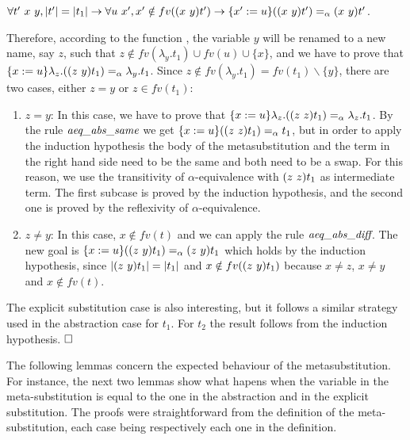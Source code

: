$\forall t'\ x\ y, |t'| = |t_1| \to \forall u\ x', x' \notin fv(\swap{x}{y}{t'}) \to \metasub{(\swap{x}{y}{t'})}{x'}{u} =_\alpha \swap{x}{y}{t'}$.
\begin{coqdoccode}
\end{coqdoccode}
Therefore, according to the function , the variable $y$ will be renamed to a new name, say $z$, such that $z \notin fv(\lambda_y.t_1) \cup fv(u) \cup \{x\}$, and we have to prove that $\metasub{\lambda_z.(\swap{z}{y}{t_1})}{x}{u} =_\alpha \lambda_y.t_1$. Since $z \notin fv(\lambda_y.t_1) = fv(t_1)\backslash \{y\}$, there are two cases, either $z = y$ or $z \in fv(t_1)$:
\begin{coqdoccode}
\end{coqdoccode}
\begin{enumerate}
   \item $z = y$: In this case, we have to prove that $\metasub{\lambda_z.(\swap{z}{z}{t_1})}{x}{u} =_\alpha \lambda_z.t_1$. By the rule $\mbox{\it aeq}\_\mbox{\it abs}\_\mbox{\it same}$ we get $\metasub{(\swap{z}{z}{t_1})}{x}{u} =_\alpha t_1$, but in order to apply the induction hypothesis the body of the metasubstitution and the term in the right hand side need to be the same and both need to be a swap. For this reason, we use the transitivity of $\alpha$-equivalence with $\swap{z}{z}{t_1}$ as intermediate term. The first subcase is proved by the induction hypothesis, and the second one is proved by the reflexivity of $\alpha$-equivalence.
\item $z \neq y$: In this case, $x \notin fv(t)$ and we can apply the rule $\mbox{\it aeq}\_\mbox{\it abs}\_\mbox{\it diff}$. The new goal is $\metasub{(\swap{z}{y}{t_1})}{x}{u} =_\alpha \swap{z}{y}{t_1}$ which holds by the induction hypothesis, since $|\swap{z}{y}{t_1}| = |t_1|$ and $x \notin fv(\swap{z}{y}{t_1})$ because $x \neq z$, $x \neq y$ and $x \notin fv(t)$.
  \end{enumerate}
\begin{coqdoccode}
\end{coqdoccode}
The explicit substitution case is also interesting, but it follows a similar strategy used in the abstraction case for $t_1$. For $t_2$ the result follows from the induction hypothesis. $\hfill\Box$ 
\begin{coqdoccode}
\coqdocemptyline
\coqdocemptyline
\end{coqdoccode}
The following lemmas concern the expected behaviour of the metasubstitution. For instance, the next two lemmas show what hapens when the variable in the meta-substitution is equal to the one in the abstraction and in the explicit substitution.  The proofs were straightforward from the definition of the meta-substitution, each case being respectively each one in the definition. \newline
